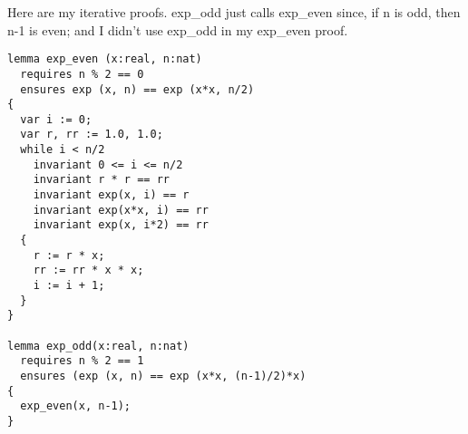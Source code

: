 \documentclass[11pt]{article}
\begin{document}
Here are my iterative proofs. \textsf{exp\_odd} just calls \textsf{exp\_even} since, if \textsf{n} is odd, then \textsf{n-1} is even; and I didn't use
\textsf{exp\_odd} in my \textsf{exp\_even} proof.
\begin{lstlisting}[language=dafny]
lemma exp_even (x:real, n:nat)
  requires n % 2 == 0
  ensures exp (x, n) == exp (x*x, n/2)
{
  var i := 0;
  var r, rr := 1.0, 1.0;
  while i < n/2
    invariant 0 <= i <= n/2
    invariant r * r == rr
    invariant exp(x, i) == r
    invariant exp(x*x, i) == rr
    invariant exp(x, i*2) == rr
  {
    r := r * x;
    rr := rr * x * x;
    i := i + 1;
  }
}

lemma exp_odd(x:real, n:nat)
  requires n % 2 == 1
  ensures (exp (x, n) == exp (x*x, (n-1)/2)*x)
{
  exp_even(x, n-1);
}
\end{lstlisting}
  
\end{document}
